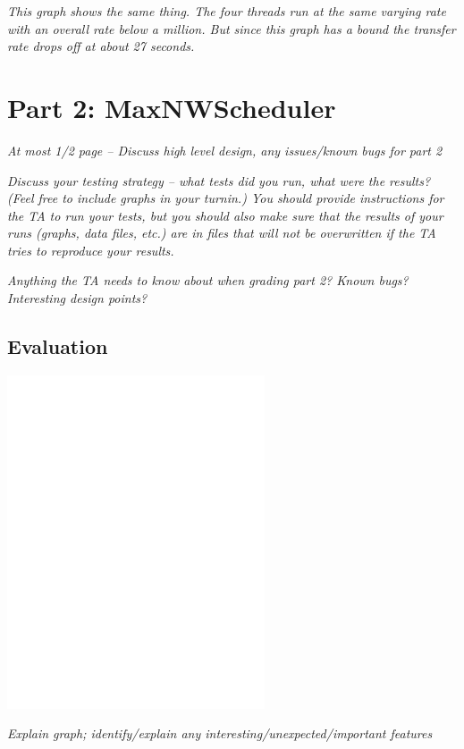 \documentclass[11pt, letterpaper]{article}
\begin{document}
{\em This graph shows the same thing. The four threads run at the same varying rate with an overall rate below a million. But since this graph has a bound the transfer rate drops off at about 27 seconds. }






\section{Part 2: MaxNWScheduler}

{\em At most 1/2 page -- Discuss high level design, any issues/known
  bugs for part 2}

{\em Discuss your testing strategy -- what tests did you run, what were the
results?  (Feel free to include graphs in your turnin.) You should
provide instructions for the TA to run your tests, but you should also
make sure that the results of your runs (graphs, data files, etc.) are
in files that will not be overwritten if the TA tries to reproduce
your results.}

{\em Anything the TA needs to know about when grading part 2? Known bugs?
Interesting design points?}


\subsection{Evaluation}

\centerline{\includegraphics[width=3in]{plot3}}

{\em Explain graph; identify/explain any
  interesting/unexpected/important features}
\end{document}
